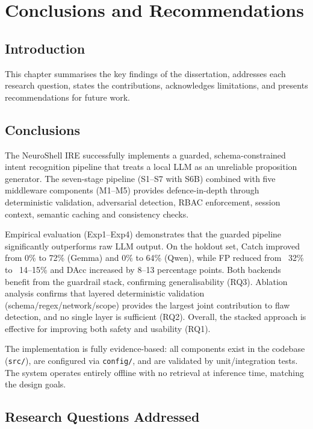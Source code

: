 ﻿\chapter{Conclusions and Recommendations}\label{ch:conclusion}

\section{Introduction}\label{sec:concl-intro}

This chapter summarises the key findings of the dissertation, addresses each research question, states the contributions, acknowledges limitations, and presents recommendations for future work.

\section{Conclusions}\label{sec:concl-conclusions}

The NeuroShell IRE successfully implements a guarded, schema-constrained intent recognition pipeline that treats a local LLM as an unreliable proposition generator. The seven-stage pipeline (S1--S7 with S6B) combined with five middleware components (M1--M5) provides defence-in-depth through deterministic validation, adversarial detection, RBAC enforcement, session context, semantic caching and consistency checks.

Empirical evaluation (Exp1--Exp4) demonstrates that the guarded pipeline significantly outperforms raw LLM output. On the holdout set, Catch improved from 0\% to 72\% (Gemma) and 0\% to 64\% (Qwen), while FP reduced from ~32\% to ~14--15\% and DAcc increased by 8--13 percentage points. Both backends benefit from the guardrail stack, confirming generalisability (RQ3). Ablation analysis confirms that layered deterministic validation (schema/regex/network/scope) provides the largest joint contribution to flaw detection, and no single layer is sufficient (RQ2). Overall, the stacked approach is effective for improving both safety and usability (RQ1).

The implementation is fully evidence-based: all components exist in the codebase (\texttt{src/}), are configured via \texttt{config/}, and are validated by unit/integration tests. The system operates entirely offline with no retrieval at inference time, matching the design goals.

\section{Research Questions Addressed}\label{sec:concl-rq}

